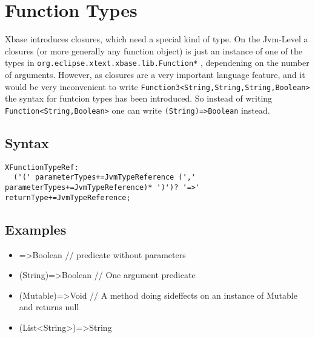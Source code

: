 \documentclass[a4paper,10pt]{scrreprt}
\newlength{\itemindentlen}
\begin{document}
\section{Function Types}
\label{FunctionTypes}
Xbase introduces closures, which need a special kind of type. On the Jvm-Level a closures (or more generally any function object) is just an instance of one of the 
types in \lstinline{org.eclipse.xtext.xbase.lib.Function*}
, dependening on the number of arguments. However, as closures are a very important language feature, and
it would be very inconvenient to write \lstinline{Function3<String,String,String,Boolean>}
 the syntax for funtcion types has been introduced. 
So instead of writing \lstinline{Function<String,Boolean>}
 one can write \lstinline{(String)=>Boolean}
 instead.

\subsection{Syntax}

\begin{lstlisting}
XFunctionTypeRef:
  ('(' parameterTypes+=JvmTypeReference (',' parameterTypes+=JvmTypeReference)* ')')? '=>' returnType+=JvmTypeReference;

\end{lstlisting}





\subsection{Examples}


\setlength{\itemindentlen}{\textwidth}
\begin{itemize}
\addtolength{\itemindentlen}{-2em}

\item \begin{minipage}[t]{\itemindentlen}
=>Boolean // predicate without parameters
\end{minipage}

\item \begin{minipage}[t]{\itemindentlen}
(String)=>Boolean // One argument predicate
\end{minipage}

\item \begin{minipage}[t]{\itemindentlen}
(Mutable)=>Void // A method doing sideffects on an instance of Mutable and returns null
\end{minipage}

\item \begin{minipage}[t]{\itemindentlen}
(List<String>)=>String
\end{minipage}

\end{itemize}
\addtolength{\itemindentlen}{2em}
\end{document}
